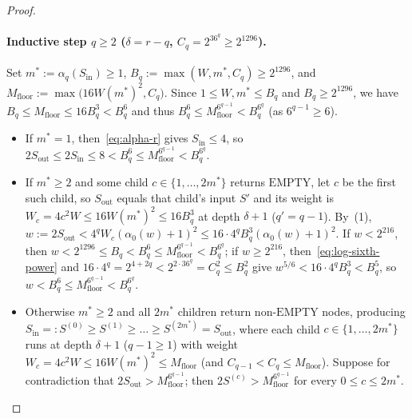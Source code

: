 \documentclass[11pt]{article}
\theoremstyle{definition}
\theoremstyle{remark}
\begin{document}
\begin{proof}
\paragraph{Inductive step $q \ge 2$ ($\delta = r - q$, $C_q = 2^{36^q} \ge 2^{1296}$).}
Set $m^* := \alpha_q(S_{\mathrm{in}}) \ge 1$, $B_q := \max(W, m^*, C_q) \ge 2^{1296}$, and $M_{\mathrm{floor}} := \max\big(16 W (m^*)^2, C_q\big)$. Since $1 \le W, m^* \le B_q$ and $B_q \ge 2^{1296}$, we have $B_q \le M_{\mathrm{floor}} \le 16 B_q^3 < B_q^6$ and thus $B_q^6 \le M_{\mathrm{floor}}^{6^{q-1}} < B_q^{6^q}$ (as $6^{q-1} \ge 6$).
\begin{itemize}[leftmargin=2em]
  \item If $m^* = 1$, then~\eqref{eq:alpha-r} gives $S_{\mathrm{in}} \le 4$, so $2 S_{\mathrm{out}} \le 2 S_{\mathrm{in}} \le 8 < B_q^6 \le M_{\mathrm{floor}}^{6^{q-1}} < B_q^{6^q}$.
  \item If $m^* \ge 2$ and some child $c \in \{1, \dots, 2 m^*\}$ returns $\mathrm{EMPTY}$, let $c$ be the first such child, so $S_{\mathrm{out}}$ equals that child's input $S'$ and its weight is $W_c = 4 c^2 W \le 16 W (m^*)^2 \le 16 B_q^3$ at depth $\delta + 1$ ($q' = q - 1$). By~(1), $w := 2 S_{\mathrm{out}} < 4^q W_c (\alpha_0(w) + 1)^2 \le 16 \cdot 4^q B_q^3 (\alpha_0(w) + 1)^2$. If $w < 2^{216}$, then $w < 2^{1296} \le B_q < B_q^6 \le M_{\mathrm{floor}}^{6^{q-1}} < B_q^{6^q}$; if $w \ge 2^{216}$, then~\eqref{eq:log-sixth-power} and $16 \cdot 4^q = 2^{4 + 2q} < 2^{2 \cdot 36^q} = C_q^2 \le B_q^2$ give $w^{5/6} < 16 \cdot 4^q B_q^3 < B_q^5$, so $w < B_q^6 \le M_{\mathrm{floor}}^{6^{q-1}} < B_q^{6^q}$.
  \item Otherwise $m^* \ge 2$ and all $2 m^*$ children return non-$\mathrm{EMPTY}$ nodes, producing $S_{\mathrm{in}} =: S^{(0)} \ge S^{(1)} \ge \dots \ge S^{(2 m^*)} = S_{\mathrm{out}}$, where each child $c \in \{1, \dots, 2 m^*\}$ runs at depth $\delta + 1$ ($q - 1 \ge 1$) with weight $W_c = 4 c^2 W \le 16 W (m^*)^2 \le M_{\mathrm{floor}}$ (and $C_{q-1} < C_q \le M_{\mathrm{floor}}$). Suppose for contradiction that $2 S_{\mathrm{out}} > M_{\mathrm{floor}}^{6^{q-1}}$; then $2 S^{(c)} > M_{\mathrm{floor}}^{6^{q-1}}$ for every $0 \le c \le 2 m^*$.


\end{itemize}
\end{proof}
\end{document}
